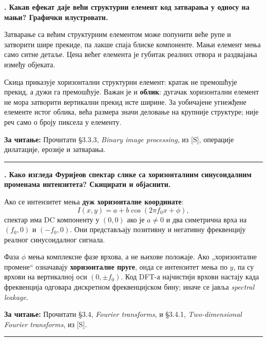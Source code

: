 \documentclass[10pt,a4paper]{article}
\newcommand{\en}[1]{\textit{#1}}
\newcounter{pitanje}
\newenvironment{odgovor}[1]{\stepcounter{pitanje}\begin{minipage}[t][0.455\textheight][t]{\textwidth}\vspace{0pt}\textbf{\thepitanje. #1}\par\smallskip}{\end{minipage}\par\ifodd\value{pitanje}\vspace{0.025\textheight}\hrule\vspace{0.015\textheight}\else\newpage\fi}
\newcommand{\izvor}[1]{\par\vfill{\footnotesize\textbf{За читање:} #1}\par}
\begin{document}
\begin{odgovor}{Какав ефекат даје већи структурни елемент код затварања у односу на мањи? Графички илустровати.}
Затварање са већим структурним елементом може попунити веће рупе и затворити шире прекиде, па лакше спаја блиске компоненте. Мањи елемент мења само ситне детаље. Цена већег елемента је губитак реалних отвора и раздвајања између објеката.
\begin{center}\end{center}
Скица приказује хоризонтални структурни елемент: кратак не премошћује прекид, а дужи га премошћује. Важан је и \textbf{облик}: дугачак хоризонтални елемент не мора затворити вертикални прекид исте ширине. За уобичајене угнежђене елементе истог облика, већа размера значи деловање на крупније структуре; није реч само о броју пиксела у елементу.
\izvor{Прочитати §3.3.3, \en{Binary image processing}, из [S], операције дилатације, ерозије и затварања.}
\end{odgovor}

\begin{odgovor}{Како изгледа Фуријеов спектар слике са хоризонталним синусоидалним променама интензитета? Скицирати и објаснити.}
Ако се интензитет мења \textbf{дуж хоризонталне координате}:
\[
I(x,y)=a+b\cos(2\pi f_0x+\phi),
\]
спектар има DC компоненту у $(0,0)$ ако је $a\ne0$ и два симетрична врха на $(f_0,0)$ и $(-f_0,0)$. Они представљају позитивну и негативну фреквенцију реалног синусоидалног сигнала.
\begin{center}\end{center}
Фаза $\phi$ мења комплексне фазе врхова, а не њихове положаје. Ако „хоризонталне промене“ означавају \textbf{хоризонталне пруге}, онда се интензитет мења по $y$, па су врхови на вертикалној оси $(0,\pm f_0)$. Код DFT-а најчистији врхови настају када фреквенција одговара дискретном фреквенцијском бину; иначе се јавља \en{spectral leakage}.
\izvor{Прочитати §3.4, \en{Fourier transforms}, и §3.4.1, \en{Two-dimensional Fourier transforms}, из [S].}
\end{odgovor}
\end{document}
